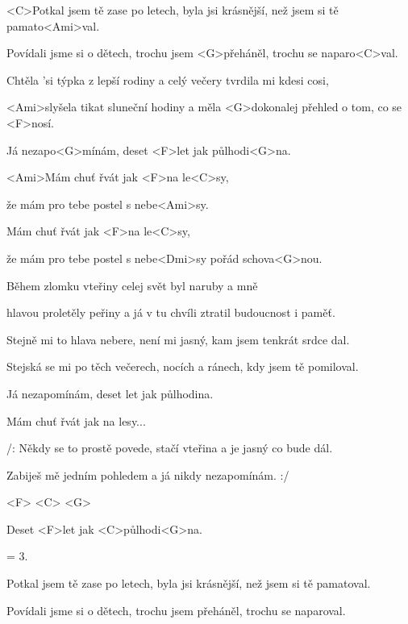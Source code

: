 

\zs
<C>Potkal jsem tě zase po letech, byla jsi krásnější, než jsem si tě pamato<Ami>val.

Povídali jsme si o dětech, trochu jsem <G>přeháněl, trochu se naparo<C>val.

Chtěla 'si týpka z lepší rodiny a celý večery tvrdila mi kdesi cosi,

<Ami>slyšela tikat sluneční hodiny a měla <G>dokonalej přehled o tom, co se <F>nosí.

Já nezapo<G>mínám, deset <F>let jak půlhodi<G>na.
\ks

\zr
<Ami>Mám chuť řvát jak <F>na le<C>sy,

že mám pro tebe postel s nebe<Ami>sy.

Mám chuť řvát jak <F>na le<C>sy,

že mám pro tebe postel s nebe<Dmi>sy pořád schova<G>nou.
\kr

\zs
Během zlomku vteřiny celej svět byl naruby a mně

hlavou proletěly peřiny a já v tu chvíli ztratil budoucnost i paměť.

Stejně mi to hlava nebere, není mi jasný, kam jsem tenkrát srdce dal.

Stejská se mi po těch večerech, nocích a ránech, kdy jsem tě pomiloval.

Já nezapomínám, deset let jak půlhodina.
\ks

\zr
Mám chuť řvát jak na lesy...
\kr

\zs
/: Někdy se to prostě povede, stačí vteřina a je jasný co bude dál.

Zabiješ mě jedním pohledem a já nikdy nezapomínám. :/
\ks

<F> <C> <G>

Deset <F>let jak <C>půlhodi<G>na.

\zs
= 3.
\ks

\zs
Potkal jsem tě zase po letech, byla jsi krásnější, než jsem si tě pamatoval.

Povídali jsme si o dětech, trochu jsem přeháněl, trochu se naparoval.
\ks

\kp
